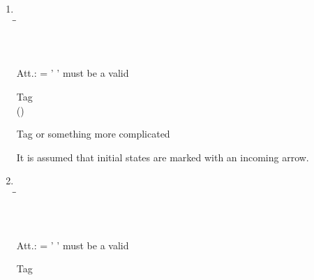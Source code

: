\begin{enumerate}
\item  {}

\begin{tabbing}
\\[\taglnskp]
\tagindent{}\tagsp \= \oneocc \= \opt \kill
\tagindent{} \>\oneocc \>\opt \\[\taglnskp]
\tagindent{}   \>\oneocc \>\opt\\[\taglnskp]
\tagindent{}         \>\oneocc \>\req  \\[\taglnskp]
\end{tabbing}

\begin{tabbing}
\ptn Att.:   = ' '  \tagsp \strng   \req   must be a valid 
\end{tabbing}

\begin{tabbing}
\ptn Tag  \\[.5ex]
\tagindent ()
\end{tabbing}

\begin{tabbing}
\ptn Tag   or something more complicated
\end{tabbing}

It is assumed that initial states are marked with an incoming arrow.

\smallskip\smallskip
\item  {}

\begin{tabbing}
\\[\taglnskp]
\tagindent{}\tagsp \= \oneocc \= \opt \kill
\tagindent{} \>\oneocc \>\opt \\[\taglnskp]
\tagindent{}   \>\oneocc \>\opt\\[\taglnskp]
\tagindent{}         \>\oneocc \>\req  \\[\taglnskp]
\end{tabbing}

\begin{tabbing}
\ptn Att.:   = ' '  \tagsp \strng   \req   must be a valid 
\end{tabbing}

\begin{tabbing}
    \ptn Tag \\[.5ex] 


\end{tabbing}
\end{enumerate}
